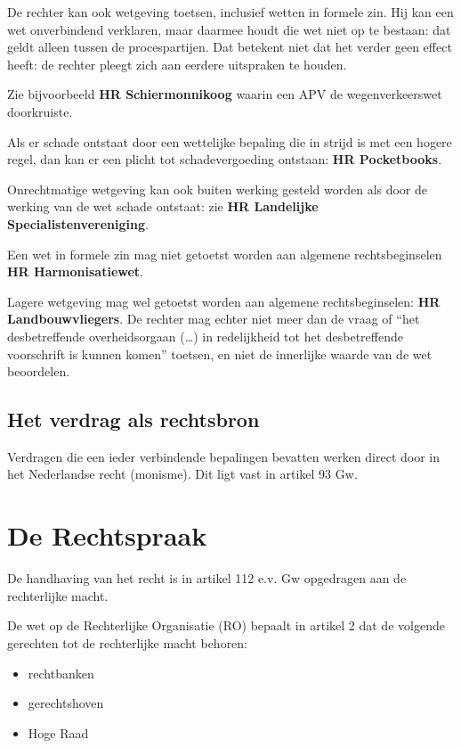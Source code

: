 \documentclass{article}
\begin{document}
De rechter kan ook wetgeving toetsen, inclusief wetten in formele zin. Hij kan
een wet onverbindend verklaren, maar daarmee houdt die wet niet op te bestaan:
dat geldt alleen tussen de procespartijen. Dat betekent niet dat het verder
geen effect heeft: de rechter pleegt zich aan eerdere uitspraken te houden. 

Zie bijvoorbeeld \textbf{HR Schiermonnikoog} waarin een APV de wegenverkeerswet
doorkruiste.

Als er schade ontstaat door een wettelijke bepaling die in strijd is met een
hogere regel, dan kan er een plicht tot schadevergoeding ontstaan: \textbf{HR
Pocketbooks}.

Onrechtmatige wetgeving kan ook buiten werking gesteld worden als door de
werking van de wet schade ontstaat: zie \textbf{HR Landelijke
Specialistenvereniging}.

Een wet in formele zin mag niet getoetst worden aan algemene rechtsbeginselen
\textbf{HR Harmonisatiewet}.

Lagere wetgeving mag wel getoetst worden aan algemene rechtsbeginselen:
\textbf{HR Landbouwvliegers}. De rechter mag echter niet meer dan de vraag of
``het desbetreffende overheidsorgaan (\ldots) in redelijkheid tot het
desbetreffende voorschrift is kunnen komen'' toetsen, en niet de innerlijke
waarde van de wet beoordelen.

\subsection{Het verdrag als rechtsbron}

Verdragen die een ieder verbindende bepalingen bevatten werken direct
door in het Nederlandse recht (monisme). Dit ligt vast in artikel 93 Gw.

\section{De Rechtspraak}

De handhaving van het recht is in artikel 112 e.v. Gw opgedragen aan de
rechterlijke macht.

De wet op de Rechterlijke Organisatie (RO) bepaalt in artikel 2 dat de 
volgende gerechten tot de rechterlijke macht behoren:

\begin{itemize}
  \item rechtbanken
  \item gerechtshoven
  \item Hoge Raad 
\end{itemize}
\end{document}
